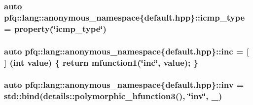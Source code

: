 \hypertarget{namespacepfq_1_1lang_1_1anonymous__namespace_02default_8hpp_03_a0c15abbec8753be8bb160633f697ed4b}{
\subsubsection[{icmp\+\_\+type}]{\setlength{\rightskip}{0pt plus 5cm}auto pfq\+::lang\+::anonymous\+\_\+namespace\{default.\+hpp\}\+::icmp\+\_\+type = {\bf property}(\char`\"{}icmp\+\_\+type\char`\"{})}}\label{namespacepfq_1_1lang_1_1anonymous__namespace_02default_8hpp_03_a0c15abbec8753be8bb160633f697ed4b}
\hypertarget{namespacepfq_1_1lang_1_1anonymous__namespace_02default_8hpp_03_acc7d3a4cca5eb30ff5456e19c613b174}{
\subsubsection[{inc}]{\setlength{\rightskip}{0pt plus 5cm}auto pfq\+::lang\+::anonymous\+\_\+namespace\{default.\+hpp\}\+::inc = \mbox{[}$\,$\mbox{]} (int value) \{ return {\bf mfunction1}(\char`\"{}inc\char`\"{}, value); \}}}\label{namespacepfq_1_1lang_1_1anonymous__namespace_02default_8hpp_03_acc7d3a4cca5eb30ff5456e19c613b174}
\hypertarget{namespacepfq_1_1lang_1_1anonymous__namespace_02default_8hpp_03_a4e7c9b70d87164407c1dd1100ddd8363}{
\subsubsection[{inv}]{\setlength{\rightskip}{0pt plus 5cm}auto pfq\+::lang\+::anonymous\+\_\+namespace\{default.\+hpp\}\+::inv = std\+::bind(details\+::polymorphic\+\_\+hfunction3(), \char`\"{}inv\char`\"{}, \+\_)}}\label{namespacepfq_1_1lang_1_1anonymous__namespace_02default_8hpp_03_a4e7c9b70d87164407c1dd1100ddd8363}
